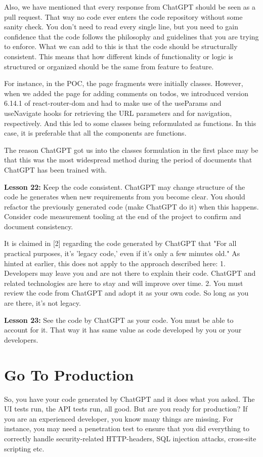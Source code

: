\documentclass[runningheads]{llncs}
\begin{document}
Also, we have mentioned that every response from ChatGPT should be seen as a pull request. That way no code ever enters the code repository without some sanity check. You don't need to read every single line, but you need to gain confidence that the code follows the philosophy and guidelines that you are trying to enforce. What we can add to this is that the code should be structurally consistent. This means that how different kinds of functionality or logic is structured or organized should be the same from feature to feature.
  
 For instance, in the POC, the page fragments were initially classes. However, when we added the page for adding comments on todos, we introduced version 6.14.1 of react-router-dom and had to make use of the useParams and useNavigate hooks for retrieving the URL parameters and for navigation, respectively. And this led to some classes being reformulated as functions. In this case, it is preferable that all the components are functions.

The reason ChatGPT got us into the classes formulation in the first place may be that this was the most widespread method during the period of documents that ChatGPT has 
been trained with.

\textbf{Lesson 22:} Keep the code consistent. ChatGPT may change structure of the code he generates when new requirements from you become clear. You should refactor the previously generated code (make ChatGPT do it) when this happens. Consider code measurement tooling at the end of the project to confirm and document consistency.

It is claimed in [2] regarding the code generated by ChatGPT that "For all practical purposes, it's 'legacy code,' even if it's only a few minutes old." As hinted at earlier, this does not apply to the approach described here:
1. Developers may leave you and are not there to explain their code. ChatGPT and related technologies are here to stay and will improve over time.
2. You must review the code from ChatGPT and adopt it as your own code. So long as you are there, it's not legacy.

\textbf{Lesson 23:} See the code by ChatGPT as your code. You must be able to account for it. That way it has same value as code developed by you or your developers.

\section{Go To Production}
So, you have your code generated by ChatGPT and it does what you asked. The UI tests run, the API tests run, all good. But are you ready for production?
If you are an experienced developer, you know many things are missing. For instance, you may need a penetration test to ensure that you did everything to correctly handle 
security-related HTTP-headers, SQL injection attacks, cross-site scripting etc.
\end{document}

